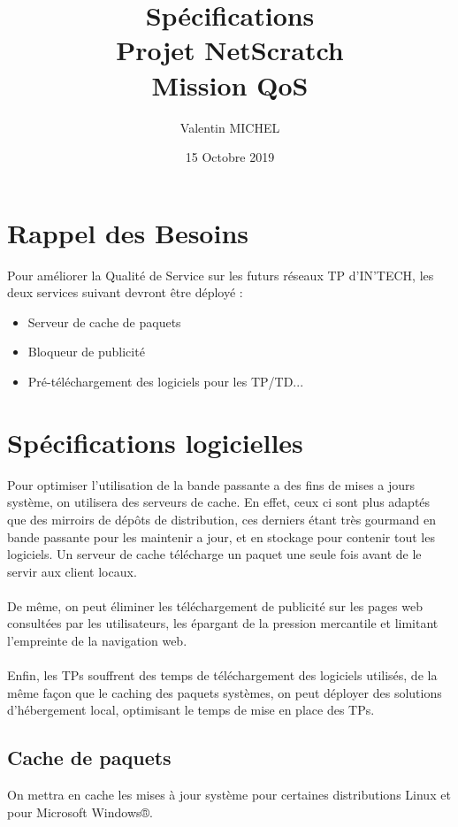 \documentclass[14pt,a4paper]{extarticle}
\author{Valentin MICHEL}
\date{15 Octobre 2019}
\title{Spécifications \\ Projet NetScratch \\ Mission QoS}
\newcommand{\windaube}{Microsoft Windows®}
\begin{document}
\maketitle{}
\justify
\break
\tableofcontents
\break
\section{Rappel des Besoins}
Pour améliorer la Qualité de Service sur les futurs réseaux TP d'IN'TECH, les deux services suivant devront être déployé :
\begin{itemize}
    \item{Serveur de cache de paquets}
    \item{Bloqueur de publicité}
    \item{Pré-téléchargement des logiciels pour les TP/TD...}
\end{itemize}
\break
\section{Spécifications logicielles}
Pour optimiser l'utilisation de la bande passante a des fins de mises a jours système, on utilisera des serveurs de cache.
En effet, ceux ci sont plus adaptés que des mirroirs de dépôts de distribution, ces derniers étant très gourmand en bande passante pour les maintenir a jour, et en stockage pour contenir tout les logiciels.
Un serveur de cache télécharge un paquet une seule fois avant de le servir aux client locaux. \\\\
De même, on peut éliminer les téléchargement de publicité sur les pages web consultées par les utilisateurs, les épargant de la pression mercantile et limitant l'empreinte de la navigation web. \\\\
Enfin, les TPs souffrent des temps de téléchargement des logiciels utilisés, de la même façon que le caching des paquets systèmes, on peut déployer des solutions d'hébergement local, optimisant le temps de mise en place des TPs. 

\break
\subsection{Cache de paquets}
On mettra en cache les mises à jour système pour certaines distributions Linux et pour \windaube.
\end{document}
